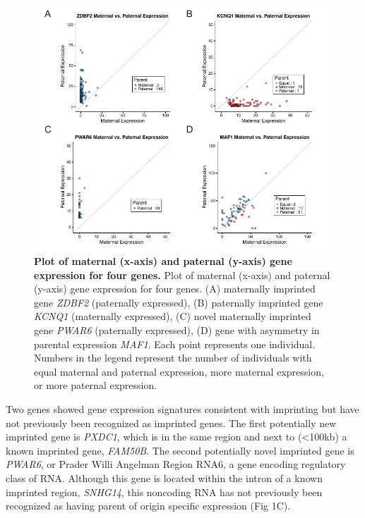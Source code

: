 \begin{figure}[!htb]
\centering \includegraphics[width=7in]{img/ch03/fig-01.pdf}
\caption[Plot of maternal (x-axis) and paternal (y-axis) gene expression for four genes.]{\textbf{Plot of maternal (x-axis) and paternal (y-axis) gene expression for four genes.} Plot of maternal (x-axis) and paternal (y-axis) gene expression for four genes. (A) maternally imprinted gene \emph{ZDBF2} (paternally expressed), (B) paternally imprinted gene \emph{KCNQ1} (maternally expressed), (C) novel maternally imprinted gene \emph{PWAR6} (paternally expressed), (D) gene with asymmetry in parental expression \emph{MAF1}. Each point represents one individual. Numbers in the legend represent the number of individuals with equal maternal and paternal expression, more maternal expression, or more paternal expression.}
\label{fig:matpatexpression}
\end{figure}


Two genes showed gene expression signatures consistent with imprinting but have not previously been recognized as imprinted genes. The first potentially new imprinted gene is \emph{PXDC1}, which is in the same region and next to (\textless100kb) a known imprinted gene, \emph{FAM50B}. The second potentially novel imprinted gene is \emph{PWAR6}, or Prader Willi Angelman Region RNA6, a gene encoding regulatory class of RNA. Although this gene is located within the intron of a known imprinted region, \emph{SNHG14}, this noncoding RNA has not previously been recognized as having parent of origin specific expression (Fig 1C).

